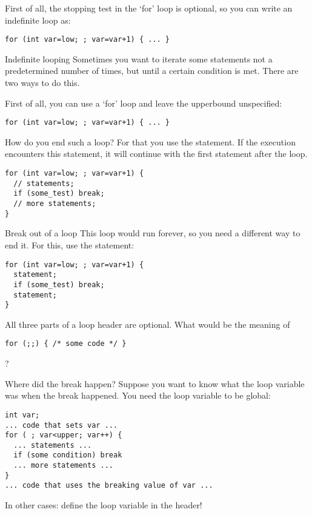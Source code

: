 First of all, the stopping test in the `for' loop is optional, so you
can write an indefinite loop as:
\begin{lstlisting}
for (int var=low; ; var=var+1) { ... }
\end{lstlisting}

\begin{slide}{Indefinite looping}
  \label{sl:for-inf}
  Sometimes you want to iterate some statements not a predetermined
  number of times, but until a certain condition is met. There are two
  ways to do this.

  First of all, you can use a `for' loop and leave the upperbound
  unspecified:
\begin{lstlisting}
for (int var=low; ; var=var+1) { ... }
\end{lstlisting}
\end{slide}

How do you end such a loop? For that you use the
 statement. If the execution encounters this
statement, it will continue with the first statement after the loop.

\begin{lstlisting}
for (int var=low; ; var=var+1) {
  // statements;
  if (some_test) break;
  // more statements;
}
\end{lstlisting}

\begin{slide}{Break out of a loop}
  \label{sl:for-break}
  This loop would run forever, so you need a different way to end
  it. For this, use the  statement:
\begin{lstlisting}
for (int var=low; ; var=var+1) {
  statement;
  if (some_test) break;
  statement;
}
\end{lstlisting}
\end{slide}

\begin{exercise}
  All three parts of a loop header are optional. What would be the
  meaning of
\begin{lstlisting}
for (;;) { /* some code */ }
\end{lstlisting}
?
\end{exercise}

\begin{block}{Where did the break happen?}
  \label{sl:for-break-var}
  Suppose you want to know what the loop variable was when the break happened.
  You need the loop variable to be global:
\begin{lstlisting}
int var;
... code that sets var ...
for ( ; var<upper; var++) {
  ... statements ...
  if (some condition) break
  ... more statements ...
}
... code that uses the breaking value of var ...
\end{lstlisting}
In other cases: define the loop variable in the header!
\end{block}

